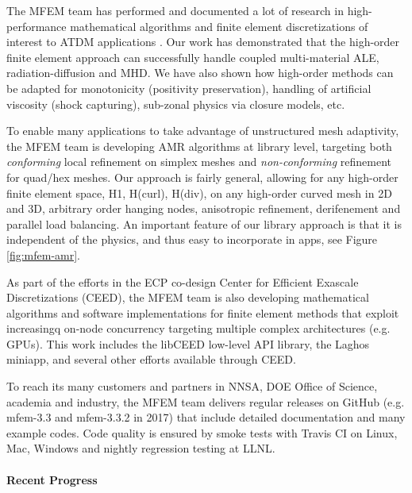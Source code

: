 The MFEM team has performed and documented a lot of research in
high-performance mathematical algorithms and finite element discretizations
of interest to ATDM applications
\cite{BLAST18,BLASTFCT18,BLASTFCT17,BLAST16,BLAST14,BLAST13,BLAST12,BLAST11}.
Our work has demonstrated that the high-order finite element approach can
successfully handle coupled multi-material ALE, radiation-diffusion and MHD.
We have also shown how high-order methods can be adapted for monotonicity
(positivity preservation), handling of artificial viscosity (shock capturing),
sub-zonal physics via closure models, etc.

To enable many applications to take advantage of unstructured mesh adaptivity,
the MFEM team is developing AMR algorithms at library level, targeting both
{\em conforming} local refinement on simplex meshes and {\em non-conforming}
refinement for quad/hex meshes. Our approach is fairly general, allowing for
any high-order finite element space, H1, H(curl), H(div), on any high-order
curved mesh in 2D and 3D, arbitrary order hanging nodes, anisotropic refinement,
derifenement and parallel load balancing.
An important feature of our library approach is that it is independent of
the physics, and thus easy to incorporate in apps, see Figure \ref{fig:mfem-amr}.

As part of the efforts in the ECP co-design Center for Efficient Exascale
Discretizations (CEED), the MFEM team is also developing mathematical algorithms
and software implementations for finite element methods that exploit increasingq
on-node concurrency targeting multiple complex architectures (e.g. GPUs). This
work includes the libCEED low-level API library, the Laghos miniapp, and several
other efforts available through CEED.

To reach its many customers and partners in NNSA, DOE Office of Science, academia
and industry, the MFEM team delivers regular releases on GitHub (e.g. mfem-3.3 and
mfem-3.3.2 in 2017) that include detailed documentation and many example codes.
Code quality is ensured by smoke tests with Travis CI on Linux, Mac, Windows and
nightly regression testing at LLNL.

\paragraph{Recent Progress}

